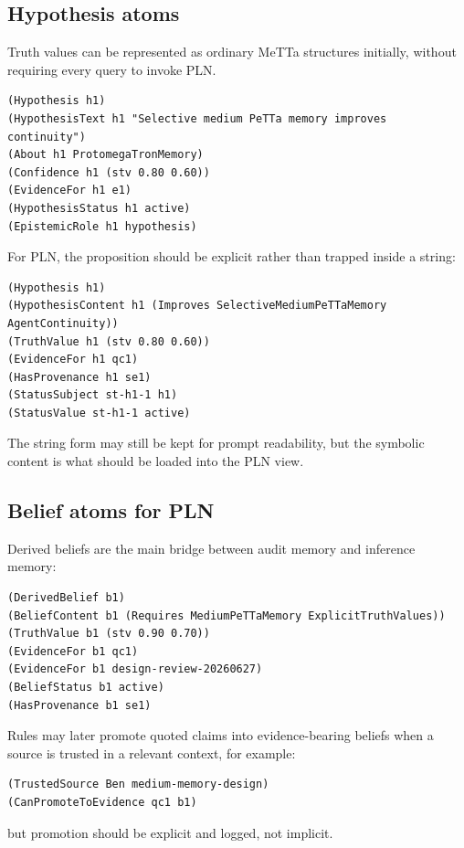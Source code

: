 \documentclass[11pt]{article}
\begin{document}
\subsection{Hypothesis atoms}

Truth values can be represented as ordinary MeTTa structures initially, without
requiring every query to invoke PLN.

\begin{verbatim}
(Hypothesis h1)
(HypothesisText h1 "Selective medium PeTTa memory improves continuity")
(About h1 ProtomegaTronMemory)
(Confidence h1 (stv 0.80 0.60))
(EvidenceFor h1 e1)
(HypothesisStatus h1 active)
(EpistemicRole h1 hypothesis)
\end{verbatim}

For PLN, the proposition should be explicit rather than trapped inside a string:

\begin{verbatim}
(Hypothesis h1)
(HypothesisContent h1 (Improves SelectiveMediumPeTTaMemory AgentContinuity))
(TruthValue h1 (stv 0.80 0.60))
(EvidenceFor h1 qc1)
(HasProvenance h1 se1)
(StatusSubject st-h1-1 h1)
(StatusValue st-h1-1 active)
\end{verbatim}

The string form may still be kept for prompt readability, but the symbolic content
is what should be loaded into the PLN view.

\subsection{Belief atoms for PLN}

Derived beliefs are the main bridge between audit memory and inference memory:

\begin{verbatim}
(DerivedBelief b1)
(BeliefContent b1 (Requires MediumPeTTaMemory ExplicitTruthValues))
(TruthValue b1 (stv 0.90 0.70))
(EvidenceFor b1 qc1)
(EvidenceFor b1 design-review-20260627)
(BeliefStatus b1 active)
(HasProvenance b1 se1)
\end{verbatim}

Rules may later promote quoted claims into evidence-bearing beliefs when a source is
trusted in a relevant context, for example:

\begin{verbatim}
(TrustedSource Ben medium-memory-design)
(CanPromoteToEvidence qc1 b1)
\end{verbatim}

but promotion should be explicit and logged, not implicit.
\end{document}
